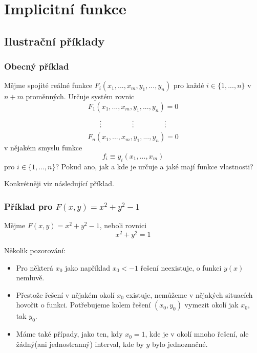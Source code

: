 \documentclass[../main.tex]{subfiles}
\begin{document}
\section{Implicitní funkce}
\hspace{1.2mm}
\noindent

\subsection{Ilustrační příklady}

\subsubsection{Obecný příklad}
\noindent
\hspace{1.2mm}
Mějme spojité reálné funkce $F_i(x_1, ... , x_m, y_1, ... , y_n)$ pro každé $i \in \{1, ..., n\}$
v $n + m$
proměnných. Určuje systém rovnic
\[ F_1(x_1, ... , x_m, y_1, ... , y_n) = 0 \]
\[ \vdots \hspace{15mm} \vdots \hspace{15mm} \vdots \]
\[ F_n(x_1, ... , x_m, y_1, ... , y_n) = 0 \]
v nějakém smyslu funkce
\[ f_i \equiv y_i(x_1, ... , x_m) \]
pro $i \in \{ 1, ... , n \}$? Pokud ano, jak a kde je určuje a jaké mají funkce vlastnosti?

\vspace{5mm}
\noindent
\hspace{1.2mm}
Konkrétněji viz následující příklad.

\subsubsection{Příklad pro $F(x,y) = x^2 + y^2 - 1$}
\noindent
\hspace{1.2mm}
Mějme $F(x,y) = x^2 + y^2 - 1$, neboli rovnici \[ x^2 + y^2 = 1 \]

\noindent
\hspace{1.2mm}
Několik pozorování:
\begin{itemize}
    \item Pro některá $x_0$ jako například $x_0 < -1$ řešení neexistuje, o funkci $y(x)$ nemluvě.
    \item Přestože řešení v nějakém okolí $x_0$ existuje, nemůžeme v nějakých situacích hovořit o funkci.
    Potřebujeme kolem řešení $(x_0, y_0)$ vymezit okolí jak $x_0$, tak $y_0$.
    \item Máme také případy, jako ten, kdy $x_0 = 1$, kde je v okolí mnoho řešení, ale žádný(ani
    jednostranný) interval, kde by $y$ bylo jednoznačné.
\end{itemize}
\end{document}
